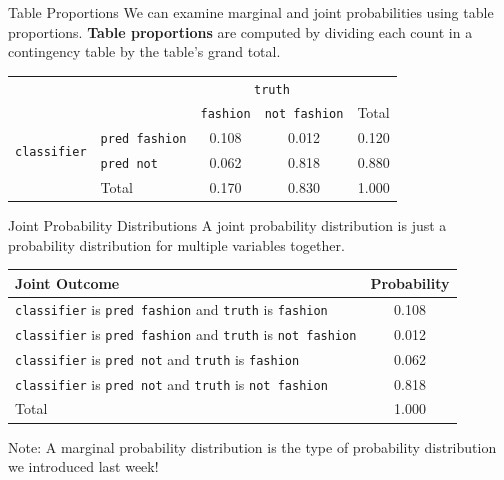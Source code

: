 \begin{frame}{Table Proportions}
    We can examine marginal and joint probabilities using table proportions. \textbf{Table proportions} are computed by dividing each count in a contingency table by the table's grand total.
    \begin{center}
        \begin{tabular}{r l cc r}
		& & \multicolumn{2}{c}{{\texttt{truth}}} & \\
        \cline{3-4}
		& & \texttt{fashion} & \texttt{not fashion} & Total  \\ 
        \cline{2-5}
        \multirow{2}{*}{{\texttt{classifier}}} 
        & \texttt{pred fashion}   & 0.108 & 0.012 & 0.120 \\ 
  		& \texttt{pred not}       & 0.062 & 0.818 & 0.880 \\ 
        \cline{2-5}
  		& Total	& 0.170 & 0.830 & 1.000 \\
        \cline{2-5}
    \end{tabular}
    \end{center}
\end{frame}

\begin{frame}{Joint Probability Distributions}
    A joint probability distribution is just a probability distribution for multiple variables together.
    \begin{center}
        \small
        \begin{tabular}{l c}
            Joint Outcome & Probability \\ 
            \hline
            \texttt{classifier} is \texttt{pred fashion} and \texttt{truth} is \texttt{fashion} & 0.108 \\
            \texttt{classifier} is \texttt{pred fashion} and \texttt{truth} is \texttt{not fashion} & 0.012 \\
            \texttt{classifier} is \texttt{pred not} and \texttt{truth} is \texttt{fashion} & 0.062 \\
            \texttt{classifier} is \texttt{pred not} and \texttt{truth} is \texttt{not fashion} & 0.818 \\
            \hline
            Total & 1.000 \\
            \hline 
        \end{tabular}
    \end{center}

    Note: A marginal probability distribution is the type of probability distribution we introduced last week!
\end{frame}

